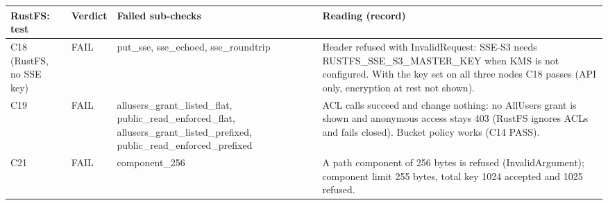 \begin{tabular}{@{}lp{2.0cm}p{3.6cm}p{7.0cm}@{}}
\toprule
RustFS: test & Verdict & Failed sub-checks & Reading (record) \\
\midrule
C18 (RustFS, no SSE key) & FAIL & put\_sse, sse\_echoed, sse\_roundtrip & Header refused with InvalidRequest: SSE-S3 needs RUSTFS\_SSE\_S3\_MASTER\_KEY when KMS is not configured. With the key set on all three nodes C18 passes (API only, encryption at rest not shown). \\
C19 & FAIL & allusers\_grant\_listed\_flat, public\_read\_enforced\_flat, allusers\_grant\_listed\_prefixed, public\_read\_enforced\_prefixed & ACL calls succeed and change nothing: no AllUsers grant is shown and anonymous access stays 403 (RustFS ignores ACLs and fails closed). Bucket policy works (C14 PASS). \\
C21 & FAIL & component\_256 & A path component of 256 bytes is refused (InvalidArgument); component limit 255 bytes, total key 1024 accepted and 1025 refused. \\
\bottomrule
\end{tabular}
